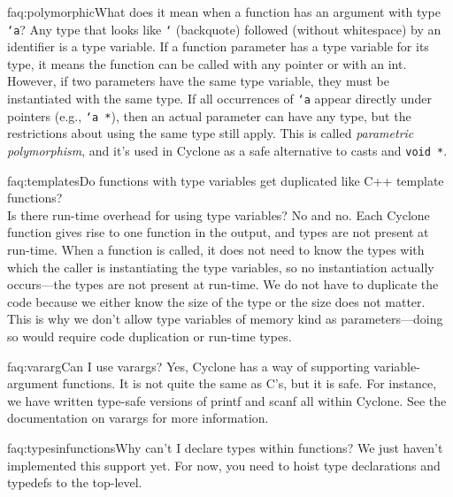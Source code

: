 \begin{faqa}{faq:polymorphic}{What does it mean when a function has an argument with type \texttt{`a}?}
Any type that looks like \texttt{`} (backquote) followed (without
whitespace) by an identifier is a type variable.  If a function
parameter has a type variable for its type, it means the function can
be called with any pointer or with an int.  However, if two parameters
have the same type variable, they must be instantiated with the same
type. If all occurrences of \texttt{`a} appear directly under pointers
(e.g., \texttt{`a *}), then an actual parameter can have any type, but
the restrictions about using the same type still apply.  This is
called \emph{parametric polymorphism}, and it's used in Cyclone as a
safe alternative to casts and \texttt{void *}.
\end{faqa}

\begin{faqa}{faq:templates}{Do functions with type variables get duplicated like C++ template functions?\\  Is there run-time overhead for using type variables?}
No and no.  Each Cyclone function gives rise to one function in the
output, and types are not present at run-time.  When a function is
called, it does not need to know the types with which the caller is
instantiating the type variables, so no instantiation actually
occurs---the types are not present at run-time.  We do not have to
duplicate the code because we either know the size of the type or the
size does not matter.  This is why we don't allow type variables of
memory kind as parameters---doing so would require code duplication or
run-time types.
\end{faqa}

\begin{faqa}{faq:vararg}{Can I use varargs?}
Yes, Cyclone has a way of supporting variable-argument functions.  It
is not quite the same as C's, but it is safe.  For instance, we have
written type-safe versions of printf and scanf all within Cyclone.
See the documentation on varargs for more information.
\end{faqa}

\begin{faqa}{faq:typesinfunctions}{Why can't I declare types within functions?}
We just haven't implemented this support yet.  For now, you need to
hoist type declarations and typedefs to the top-level.
\end{faqa}

